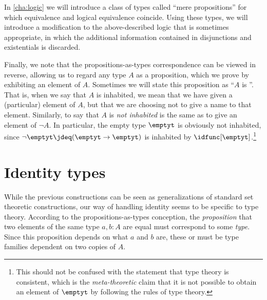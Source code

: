 In \cref{cha:logic} we will introduce a class of types called ``mere propositions'' for which equivalence and logical equivalence coincide.
Using these types, we will introduce a modification to the above-described logic that is sometimes appropriate, in which the additional information contained in disjunctions and existentials is discarded.

Finally, we note that the propositions-as-types correspondence can be viewed in reverse, allowing us to regard any type $A$ as a proposition, which we prove by exhibiting an element of $A$.
Sometimes we will state this proposition as ``$A$ is ''.
%
%
That is, when we say that $A$ is inhabited, we mean that we have given a (particular) element of $A$, but that we are choosing not to give a name to that element.
Similarly, to say that $A$ is \emph{not inhabited} is the same as to give an element of $\neg A$.
In particular, the empty type $\emptyt$ is obviously not inhabited, since $\neg \emptyt \jdeq (\emptyt \to \emptyt)$ is inhabited by $\idfunc[\emptyt]$.\footnote{This should not be confused with the statement that type theory is consistent, which is the \emph{meta-theoretic} claim that it is not possible to obtain an element of $\emptyt$ by following the rules of type theory.}

%
%
%

\section{Identity types}
\label{sec:identity-types}

%
%
%
%
While the previous constructions can be seen as generalizations of
standard set theoretic constructions, our way of handling identity  seems to be
specific to type theory.
According to the propositions-as-types conception, the \emph{proposition} that two elements of the same type $a,b:A$ are equal must correspond to some \emph{type}.
Since this proposition depends on what $a$ and $b$ are, these  or  must be type families dependent on two copies of $A$.

